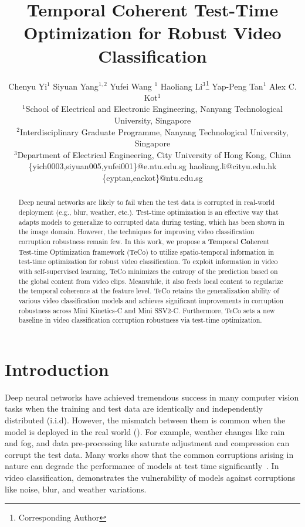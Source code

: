 \documentclass{article} %
\title{Temporal Coherent Test-Time Optimization for Robust Video Classification}
\author{Chenyu Yi$^{1}$ \quad Siyuan Yang$^{1,2}$ \quad Yufei Wang $^{1}$  \quad Haoliang Li$^3$\thanks{Corresponding Author}  \quad Yap-Peng Tan$^1$ \quad Alex C. Kot$^1$ \quad 
\\
$^1$School of Electrical and Electronic Engineering, Nanyang Technological University, Singapore \\
$^2$Interdisciplinary Graduate Programme, Nanyang Technological University, Singapore  \\
$^3$Department of Electrical Engineering, City University of Hong Kong, China\\
\{yich0003,siyuan005,yufei001\}@e.ntu.edu.sg \quad haoliang.li@cityu.edu.hk \quad \{eyptan,eackot\}@ntu.edu.sg
}
\begin{document}
\maketitle

\begin{abstract}
Deep neural networks are likely to fail when the test data is corrupted in real-world deployment (e.g., blur, weather, etc.). Test-time optimization is an effective way that adapts models to generalize to corrupted data during testing, which has been shown in the image domain. However, the techniques for improving video classification corruption robustness remain few. In this work, we propose a \textbf{Te}mporal \textbf{Co}herent Test-time Optimization framework ({TeCo}) to utilize spatio-temporal information in test-time optimization for robust video classification. To exploit information in video with self-supervised learning, 
TeCo minimizes the entropy of the prediction based on the global content from video clips.
Meanwhile, it also feeds local content to regularize the temporal coherence at the feature level. TeCo retains the generalization ability of various video classification models and achieves significant improvements in corruption robustness across Mini Kinetics-C and Mini SSV2-C. Furthermore, TeCo sets a new baseline in video classification corruption robustness via test-time optimization.  
\end{abstract}

\section{Introduction}
Deep neural networks have achieved tremendous success in many computer vision tasks when the training and test data are identically and independently distributed (i.i.d). However, the mismatch between them is common when the model is deployed in the real world (\cite{wang2022variational, li2020domain}). For example, weather changes like rain and fog, and data pre-processing like saturate adjustment and compression can corrupt the test data. Many works show that the common corruptions arising in nature can degrade the performance of models at test time significantly~\citep{hendrycks2019benchmarking,yi2021benchmarking,kar20223d,geirhos2018generalisation, yu2022towards}. In video classification, \cite{yi2021benchmarking} demonstrates the vulnerability of models against corruptions like noise, blur, and weather variations. 
\end{document}
